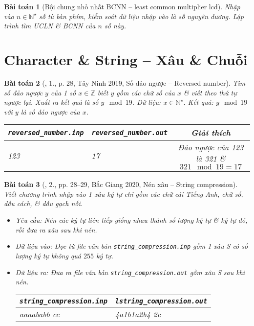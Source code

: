 \documentclass{article}
\newtheorem{baitoan}{Bài toán}
\begin{document}
\begin{baitoan}[Bội chung nhỏ nhất BCNN -- least common multiplier lcd]
	Nhập vào $n\in\mathbb{N}^\star$ số từ bàn phím, kiểm soát dữ liệu nhập vào là số nguyên dương. Lập trình tìm \emph{ƯCLN} \& \emph{BCNN} của $n$ số này.
\end{baitoan}


\section{Character \& String -- Xâu \& Chuỗi}

\begin{baitoan}[\cite{VietSTEM2021}, 1., p. 28, Tây Ninh 2019, Số đảo ngược -- Reversed number]
	Tìm số đảo ngược $y$ của 1 số $x\in\mathbb{Z}$ biết $y$ gồm các chữ số của $x$ \& viết theo thứ tự ngược lại. Xuất ra kết quả là số $y\mod19$. {\sf Dữ liệu:} $x\in\mathbb{N}^\star$. {\sf Kết quả:} $y\mod19$ với $y$ là số đảo ngược của $x$.
	\begin{table}[H]
		\centering
		\begin{tabular}{|l|l|c|}
			\hline
			\verb|reversed_number.inp| & \verb|reversed_number.out| & Giải thích \\
			\hline
			123 & 17 & Đảo ngược của 123 là 321 \& $321\mod19 = 17$ \\
			\hline
		\end{tabular}
	\end{table}
\end{baitoan}

\begin{baitoan}[\cite{VietSTEM2021}, 2., pp. 28--29, Bắc Giang 2020, Nén xâu -- String compression]
	Viết chương trình nhập vào 1 xâu ký tự chỉ gồm các chữ cái Tiếng Anh, chữ số, dấu cách, \& dấu gạch nối.
	\begin{itemize}
		\item {\sf Yêu cầu:} Nén các ký tự liên tiếp giống nhau thành số lượng ký tự \& ký tự đó, rồi đưa ra xâu sau khi nén.
		\item {\sf Dữ liệu vào:} Đọc từ file văn bản \verb|string_compression.inp| gồm 1 xâu S có số lượng ký tự không quá $255$ ký tự.
		\item {\sf Dữ liệu ra:} Đưa ra file văn bản \verb|string_compression.out| gồm xâu S sau khi nén.
		\begin{table}[H]
			\centering
			\begin{tabular}{|l|l|}
				\hline
				\verb|string_compression.inp| & \verb|lstring_compression.out| \\
				\hline
				aaaababb    cc & 4a1b1a2b4 2c \\
				\hline
			\end{tabular}
		\end{table}
	\end{itemize}
\end{baitoan}
\end{document}
